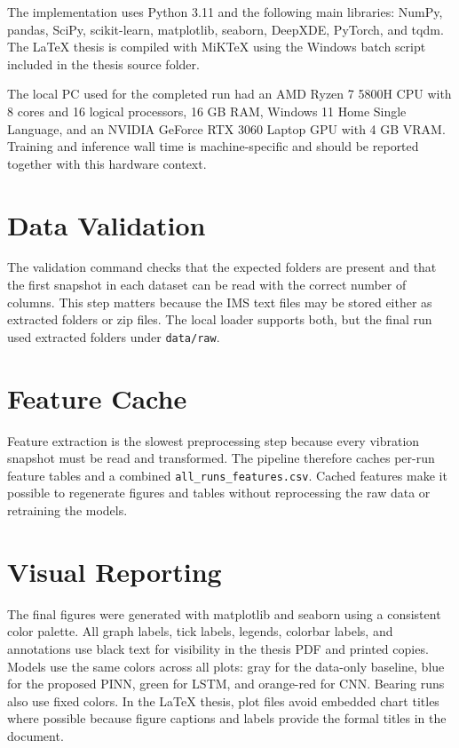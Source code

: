 The implementation uses Python 3.11 and the following main libraries: NumPy, pandas, SciPy, scikit-learn, matplotlib, seaborn, DeepXDE, PyTorch, and tqdm. The LaTeX thesis is compiled with MiKTeX using the Windows batch script included in the thesis source folder.

The local PC used for the completed run had an AMD Ryzen 7 5800H CPU with 8 cores and 16 logical processors, 16 GB RAM, Windows 11 Home Single Language, and an NVIDIA GeForce RTX 3060 Laptop GPU with 4 GB VRAM. Training and inference wall time is machine-specific and should be reported together with this hardware context.

\section{Data Validation}

The validation command checks that the expected folders are present and that the first snapshot in each dataset can be read with the correct number of columns. This step matters because the IMS text files may be stored either as extracted folders or zip files. The local loader supports both, but the final run used extracted folders under \texttt{data/raw}.

\section{Feature Cache}

Feature extraction is the slowest preprocessing step because every vibration snapshot must be read and transformed. The pipeline therefore caches per-run feature tables and a combined \texttt{all\_runs\_features.csv}. Cached features make it possible to regenerate figures and tables without reprocessing the raw data or retraining the models.

\section{Visual Reporting}

The final figures were generated with matplotlib and seaborn using a consistent color palette. All graph labels, tick labels, legends, colorbar labels, and annotations use black text for visibility in the thesis PDF and printed copies. Models use the same colors across all plots: gray for the data-only baseline, blue for the proposed PINN, green for LSTM, and orange-red for CNN. Bearing runs also use fixed colors. In the LaTeX thesis, plot files avoid embedded chart titles where possible because figure captions and labels provide the formal titles in the document.

